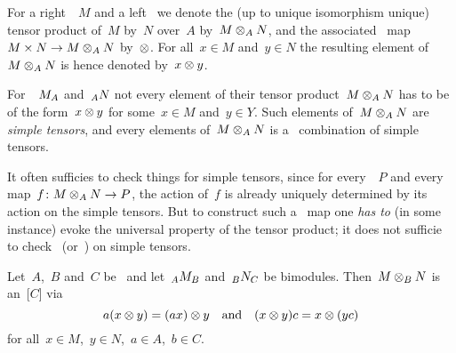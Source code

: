 \begin{notationnonum}
  For a right~{}~$M$ and a left~{} we denote the (up to unique isomorphism unique) tensor product of~$M$ by~$N$ over~$A$ by~$M \otimes_A N$, and the associated~{} map~$M \times N \to M \otimes_A N$ by~$\otimes$.
  For all~$x \in M$ and~$y \in N$ the resulting element of~$M \otimes_A N$ is hence denoted by~$x \otimes y$.
\end{notationnonum}


\begin{warning*}
  For~{}~$\indmodule{M}[A]$ and~$\indmodule[A]{N}$ not every element of their tensor product~$M \otimes_A N$ has to be of the form~$x \otimes y$ for some~$x \in M$ and~$y \in Y$.
  Such elements of~$M \otimes_A N$ are \emph{simple tensors}, and every elements of~$M \otimes_A N$ is a~{\klin} combination of simple tensors.
  
  It often sufficies to check things for simple tensors, since for every~{\module{$\kf$}}~$P$ and every~{\klin} map~$f \colon M \otimes_A N \to P$, the action of~$f$ is already uniquely determined by its action on the simple tensors.
  But to construct such a~{\klin} map one \emph{has to} (in some instance) evoke the universal property of the tensor product;
  it does not sufficie to check~ (or~) on simple tensors.
\end{warning*}


\begin{lemma}
  Let~$A$,~$B$ and~$C$ be~{\kalgs} and let~$\indmodule[A]{M}[B]$ and~$\indmodule[B]{N}[C]$ be bimodules.
  Then~$M \otimes_B N$ is an~{[$C$]} via
  \[
      a (x \otimes y)
    = (ax) \otimes y
    \quad\text{and}\quad
      (x \otimes y) c
    = x \otimes (yc)
  \]
  for all~$x \in M$,~$y \in N$,~$a \in A$,~$b \in C$.
\end{lemma}


